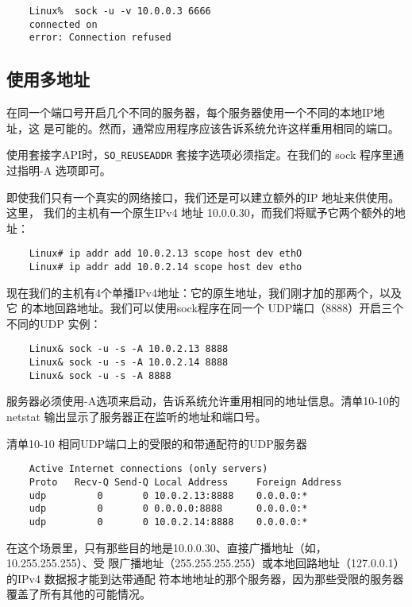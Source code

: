 \begin{verbatim}
    Linux%  sock -u -v 10.0.0.3 6666
    connected on
    error: Connection refused
\end{verbatim}

\subsection{使用多地址}
在同一个端口号开启几个不同的服务器，每个服务器使用一个不同的本地IP地址，这
是可能的。然而，通常应用程序应该告诉系统允许这样重用相同的端口。

\begin{tcolorbox}
  使用套接字API时，\verb|SO_REUSEADDR| 套接字选项必须指定。在我们的
  sock 程序里通过指明-A 选项即可。
\end{tcolorbox}

即使我们只有一个真实的网络接口，我们还是可以建立额外的IP 地址来供使用。这里，
我们的主机有一个原生IPv4 地址 10.0.0.30，而我们将赋予它两个额外的地址：

\begin{verbatim}
    Linux# ip addr add 10.0.2.13 scope host dev ethO
    Linux# ip addr add 10.0.2.14 scope host dev etho
\end{verbatim}

现在我们的主机有4个单播IPv4地址：它的原生地址，我们刚才加的那两个，以及它
的本地回路地址。我们可以使用sock程序在同一个 UDP端口（8888）开启三个不同的UDP
实例：

\begin{verbatim}
    Linux& sock -u -s -A 10.0.2.13 8888
    Linux& sock -u -s -A 10.0.2.14 8888
    Linux& sock -u -s -A 8888
\end{verbatim}

服务器必须使用-A选项来启动，告诉系统允许重用相同的地址信息。清单10-10的
netstat 输出显示了服务器正在监听的地址和端口号。

清单10-10 相同UDP端口上的受限的和带通配符的UDP服务器
\begin{verbatim}
    Active Internet connections (only servers)
    Proto   Recv-Q Send-Q Local Address     Foreign Address
    udp         0       0 10.0.2.13:8888    0.0.0.0:*
    udp         0       0 0.0.0.0:8888      0.0.0.0:*
    udp         0       0 10.0.2.14:8888    0.0.0.0:*
\end{verbatim}

在这个场景里，只有那些目的地是10.0.0.30、直接广播地址（如，10.255.255.255）、受
限广播地址（255.255.255.255）或本地回路地址（127.0.0.1）的IPv4 数据报才能到达带通配
符本地地址的那个服务器，因为那些受限的服务器覆盖了所有其他的可能情况。

